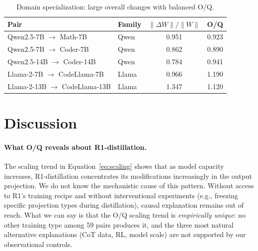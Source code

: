 \documentclass[11pt]{article}
\newcommand{\dwnorm}{\|\Delta W\|/\|W\|}
\begin{document}
\begin{table}[h]
\centering
\caption{Domain specialization: large overall changes with balanced O/Q.}
\label{tab:domain}
\begin{tabular}{llcc}
\toprule
Pair & Family & $\dwnorm$ & O/Q \\
\midrule
Qwen2.5-7B $\to$ Math-7B & Qwen & 0.951 & 0.923 \\
Qwen2.5-7B $\to$ Coder-7B & Qwen & 0.862 & 0.890 \\
Qwen2.5-14B $\to$ Coder-14B & Qwen & 0.784 & 0.941 \\
Llama-2-7B $\to$ CodeLlama-7B & Llama & 0.966 & 1.190 \\
Llama-2-13B $\to$ CodeLlama-13B & Llama & 1.347 & 1.120 \\
\bottomrule
\end{tabular}
\end{table}




\section{Discussion}
\label{sec:discussion}

\paragraph{What O/Q reveals about R1-distillation.}
The scaling trend in Equation~\ref{eq:scaling} shows that as model capacity
increases, R1-distillation concentrates its modifications increasingly in the
output projection.
We do not know the mechanistic cause of this pattern.
Without access to R1's training recipe and without interventional experiments
(e.g., freezing specific projection types during distillation), causal
explanation remains out of reach.
What we can say is that the O/Q scaling trend is \emph{empirically unique}:
no other training type among 59 pairs produces it, and the three most natural
alternative explanations (CoT data, RL, model scale) are not supported by our
observational controls.
\end{document}
